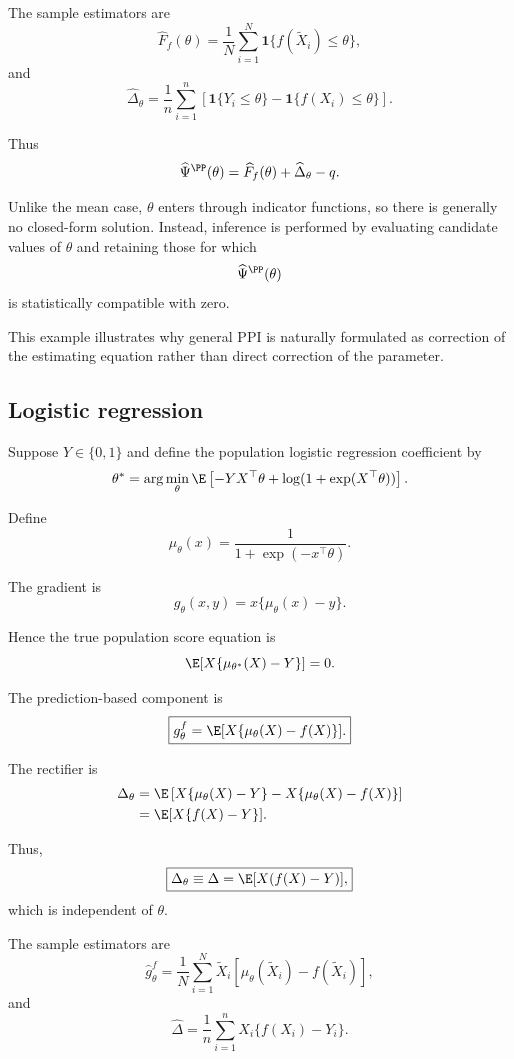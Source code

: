 The sample estimators are
\[
\widehat F_f(\theta)
=
\frac{1}{N}
\sum_{i=1}^N
\mathbf{1}
\{f(\widetilde X_i)\leq\theta\},
\]
and
\[
\widehat\Delta_\theta
=
\frac{1}{n}
\sum_{i=1}^n
\left[
\mathbf{1}\{Y_i\leq\theta\}
-
\mathbf{1}\{f(X_i)\leq\theta\}
\right].
\]

Thus
\[
\widehat\Psi^{\PP}(\theta)
=
\widehat F_f(\theta)
+
\widehat\Delta_\theta
-
q.
\]

Unlike the mean case, $\theta$ enters through indicator functions, so
there is generally no closed-form solution. Instead, inference is
performed by evaluating candidate values of $\theta$ and retaining those
for which
\[
\widehat\Psi^{\PP}(\theta)
\]
is statistically compatible with zero.

This example illustrates why general PPI is naturally formulated as
correction of the estimating equation rather than direct correction of
the parameter.

\subsection{Logistic regression}

Suppose $Y\in\{0,1\}$ and define the population logistic regression
coefficient by
\[
\theta^*
=
\arg\min_\theta
\E
\left[
-YX^\top\theta
+
\log(1+\exp(X^\top\theta))
\right].
\]

Define
\[
\mu_\theta(x)
=
\frac{1}{1+\exp(-x^\top\theta)}.
\]

The gradient is
\[
\boxed{
g_\theta(x,y)
=
x\{\mu_\theta(x)-y\}.
}
\]

Hence the true population score equation is
\[
\E[
X\{\mu_{\theta^*}(X)-Y\}
]
=
0.
\]

The prediction-based component is
\[
\boxed{
g_\theta^f
=
\E[
X\{\mu_\theta(X)-f(X)\}
].
}
\]

The rectifier is
\[
\begin{aligned}
\Delta_\theta
&=
\E\left[
X\{\mu_\theta(X)-Y\}
-
X\{\mu_\theta(X)-f(X)\}
\right]
\\
&=
\E[X\{f(X)-Y\}].
\end{aligned}
\]

Thus,
\[
\boxed{
\Delta_\theta
\equiv
\Delta
=
\E[X(f(X)-Y)],
}
\]
which is independent of $\theta$.

The sample estimators are
\[
\widehat g_\theta^f
=
\frac{1}{N}
\sum_{i=1}^N
\widetilde X_i
\left[
\mu_\theta(\widetilde X_i)
-
f(\widetilde X_i)
\right],
\]
and
\[
\widehat\Delta
=
\frac{1}{n}
\sum_{i=1}^n
X_i
\{f(X_i)-Y_i\}.
\]

